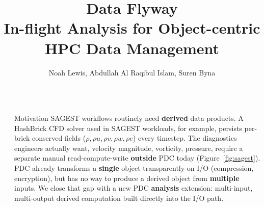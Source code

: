 \documentclass[final]{beamer}
\title{Data Flyway \\ \Large In-flight Analysis for Object-centric HPC Data Management} %
\author{Noah Lewis, Abdullah Al Raqibul Islam, Suren Byna} %
\institute{Integration Team} %
\newlength{\sepwid}
\newlength{\colwid}
\begin{document}

\setlength{\belowcaptionskip}{2ex} %
\setlength\belowdisplayshortskip{2ex} %

\begin{frame}[t] %

\begin{columns}[t] %

\begin{column}{\sepwid}\end{column} %

\begin{column}{\colwid} %


\begin{alertblock}{Motivation}
  SAGEST workflows routinely need \textbf{derived} data products. A HashBrick
  CFD solver used in SAGEST workloads, for example, persists per-brick
  conserved fields ($\rho,\rho u,\rho v,\rho w,\rho e$) every timestep. The diagnostics
  engineers actually want, velocity magnitude, vorticity, pressure, require a
  separate manual read-compute-write \textbf{outside} PDC today
  (Figure~\ref{fig:sagest}). PDC already transforms a \textbf{single} object
  transparently on I/O (compression, encryption), but has no way to produce a
  derived object from \textbf{multiple} inputs. We close that gap with a new
  PDC \textbf{analysis} extension: multi-input, multi-output derived
  computation built directly into the I/O path.


\end{alertblock}
\end{column}
\end{columns}
\end{frame}
\end{document}
